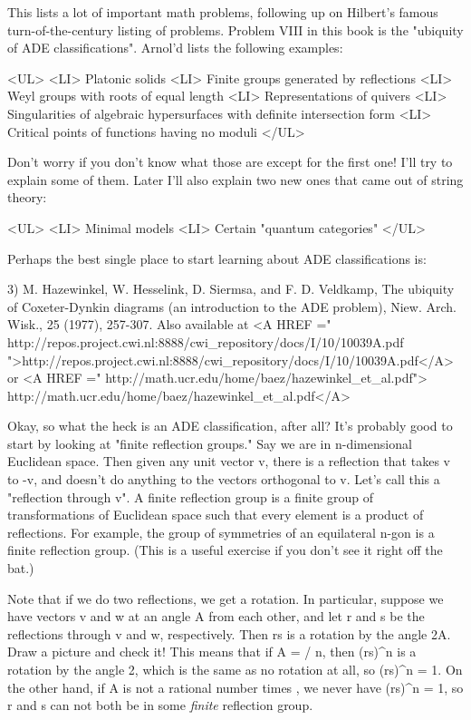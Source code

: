 This lists a lot of important math problems, following up on
Hilbert's famous turn-of-the-century listing of problems.  Problem 
VIII in this book is the "ubiquity of ADE classifications".  Arnol'd
lists the following examples:

<UL>
<LI> Platonic solids
<LI> Finite groups generated by reflections
<LI> Weyl groups with roots of equal length
<LI> Representations of quivers
<LI> Singularities of algebraic hypersurfaces with definite intersection form
<LI> Critical points of functions having no moduli
</UL>

Don't worry if you don't know what those are except for the first one!
I'll try to explain some of them.  Later I'll also explain two new ones
that came out of string theory:

<UL>
<LI> Minimal models 
<LI> Certain "quantum categories"
</UL>

Perhaps the best single place to start learning about ADE classifications
is:

3) M. Hazewinkel, W. Hesselink, D. Siermsa, and F. D. Veldkamp, The 
ubiquity of Coxeter-Dynkin diagrams (an introduction to the ADE problem), 
Niew. Arch. Wisk., 25 (1977), 257-307.
Also available at
<A HREF =" http://repos.project.cwi.nl:8888/cwi_repository/docs/I/10/10039A.pdf
">http://repos.project.cwi.nl:8888/cwi_repository/docs/I/10/10039A.pdf</A>
or 
<A HREF =" http://math.ucr.edu/home/baez/hazewinkel_et_al.pdf">
http://math.ucr.edu/home/baez/hazewinkel_et_al.pdf</A>

Okay, so what the heck is an ADE classification, after all?  It's
probably good to start by looking at "finite reflection
groups." Say we are in n-dimensional Euclidean space.  Then given
any unit vector v, there is a reflection that takes v to -v, and
doesn't do anything to the vectors orthogonal to v.  Let's call this a
"reflection through v".  A finite reflection group is a
finite group of transformations of Euclidean space such that every
element is a product of reflections.  For example, the group of
symmetries of an equilateral n-gon is a finite reflection group.
(This is a useful exercise if you don't see it right off the bat.)

Note that if we do two reflections, we get a rotation.  In particular,
suppose we have vectors v and w at an angle A from each other, and let
r and s be the reflections through v and w, respectively.  Then rs is
a rotation by the angle 2A.  Draw a picture and check it!  This means
that if A = \pi  / n, then (rs)^{n} is a rotation by the angle
2\pi , which is the same as no rotation at all, so (rs)^{n} =
1.  On the other hand, if A is not a rational number times \pi , we
never have (rs)^{n} = 1, so r and s can not both be in some
\emph{finite} reflection group.

